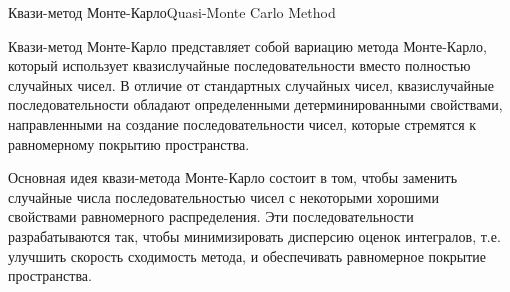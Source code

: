 \documentclass{beamer}
\begin{document}
	\begin{frame}{Квази-метод Монте-Карло}{Quasi-Monte Carlo Method}
		
		Квази-метод Монте-Карло представляет собой вариацию метода Монте-Карло, который использует квазислучайные последовательности вместо полностью случайных чисел. В отличие от стандартных случайных чисел, квазислучайные последовательности обладают определенными детерминированными свойствами, направленными на создание последовательности чисел, которые стремятся к равномерному покрытию пространства.

		Основная идея квази-метода Монте-Карло состоит в том, чтобы заменить случайные числа последовательностью чисел с некоторыми хорошими свойствами равномерного распределения. Эти последовательности разрабатываются так, чтобы минимизировать дисперсию оценок интегралов, т.е. улучшить скорость сходимость метода, и обеспечивать равномерное покрытие пространства.
		
		


		
	\end{frame}
\end{document}
